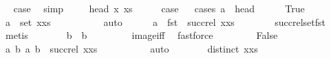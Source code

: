 \begin{isabellebody}
\ \isamarkupfalse%
\ {\isacharquery}case\ \isamarkupfalse%
\ simp\isanewline
{}\isamarkupfalse%
\isanewline
\ \ \isamarkupfalse%
\ {\isacharparenleft}{}\ head\ x\ xs{\isacharparenright}\isanewline
\ \ \isamarkupfalse%
\ \isamarkupfalse%
\ {\isacharquery}case\isanewline
\ \ \isamarkupfalse%
{\isacharparenleft}cases\ {\isachardoublequoteopen}a\ {\isacharequal}\ head{\isachardoublequoteclose}{\isacharparenright}\isanewline
\ \ \ \ \isamarkupfalse%
\ True\isanewline
\ \ \ \ \isamarkupfalse%
\ {\isachardoublequoteopen}a\ {\isasymnotin}\ set\ {\isacharparenleft}x{\isacharhash}xs{\isacharparenright}{\isachardoublequoteclose}\isanewline
\ \ \ \ \ \ \isamarkupfalse%
\ {}\ \isamarkupfalse%
\ auto\isanewline
\ \ \ \ \isamarkupfalse%
\ {\isachardoublequoteopen}a\ {\isasymnotin}\ fst\ {\isacharbackquote}\ {\isacharparenleft}succ{\isacharunderscore}rel\ {\isacharparenleft}x{\isacharhash}xs{\isacharparenright}{\isacharparenright}{\isachardoublequoteclose}\isanewline
\ \ \ \ \ \ \isamarkupfalse%
\ succ{\isacharunderscore}rel{\isacharunderscore}set{\isacharunderscore}fst\ \isamarkupfalse%
\ metis\isanewline
\ \ \ \ \isamarkupfalse%
\ \isamarkupfalse%
\ {\isachardoublequoteopen}b{}\ {\isacharequal}\ b{}{\isachardoublequoteclose}\isanewline
\ \ \ \ \ \ \isamarkupfalse%
\ {}\ image{\isacharunderscore}iff\ \isamarkupfalse%
\ fastforce\isanewline
\ \ \isamarkupfalse%
\isanewline
\ \ \ \ \isamarkupfalse%
\ False\isanewline
\ \ \ \ \isamarkupfalse%
\ {\isachardoublequoteopen}{\isacharbraceleft}{\isacharparenleft}a{\isacharcomma}\ b{}{\isacharparenright}{\isacharcomma}\ {\isacharparenleft}a{\isacharcomma}\ b{}{\isacharparenright}{\isacharbraceright}\ {\isasymsubseteq}\ succ{\isacharunderscore}rel\ {\isacharparenleft}x{\isacharhash}xs{\isacharparenright}{\isachardoublequoteclose}\isanewline
\ \ \ \ \ \ \isamarkupfalse%
\ {}\ \isamarkupfalse%
\ auto\isanewline
\ \ \ \ \isamarkupfalse%
\ \isamarkupfalse%
\ {\isachardoublequoteopen}distinct\ {\isacharparenleft}x{\isacharhash}xs{\isacharparenright}{\isachardoublequoteclose}\isanewline
\ \ \ \ \ \ \isamarkupfalse%

\end{isabellebody}
